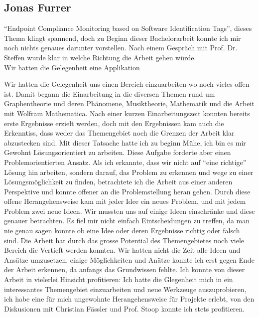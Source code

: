 \subsection{Jonas Furrer} 



\enquote{Endpoint Compliance Monitoring based on Software Identification Tags}, dieses Thema klingt spannend, doch zu Beginn dieser Bachelorarbeit konnte ich mir noch nichts genaues darunter vorstellen. Nach einem Gespräch mit Prof. Dr. Steffen wurde klar in welche Richtung die Arbeit gehen würde.\\
Wir hatten die Gelegenheit eine Applikation 

Wir hatten die Gelegenheit uns einen
Bereich einzuarbeiten wo noch vieles offen ist. Damit begann die Einarbeitung in
die diversen Themen rund um Graphentheorie und deren Phänomene, Musiktheorie,
Mathematik und die Arbeit mit Wolfram Mathematica. Nach einer kurzen
Einarbeitungszeit konnten bereits erste Ergebnisse erzielt werden, doch mit den
Ergebnissen kam auch die Erkenntiss, dass weder das Themengebiet noch die
Grenzen der Arbeit klar abzustecken sind. Mit dieser Tatsache hatte ich zu
beginn Mühe, ich bin es mir Gewohnt Lösungsorientiert zu arbeiten. Diese Aufgabe
forderte aber einen Problemorientierten Ansatz. Als ich erkannte, dass wir nicht
auf \enquote{eine richtige} Lösung hin arbeiten, sondern darauf, das Problem zu
erkennen und wege zu einer Lösungsmöglichkeit zu finden, betrachtete ich die
Arbeit aus einer anderen Perspektive und konnte offener an die Problemstellung
heran gehen. Durch diese offene Herangehensweise kam mit jeder Idee ein neues
Problem, und mit jedem Problem zwei neue Ideen. Wir mussten uns auf einige Ideen
einschränke und diese genauer betrachten. Es fiel mir nicht einfach
Eintscheidungen zu treffen, da man nie genau sagen konnte ob eine Idee oder
deren Ergebnisse richtig oder falsch sind. Die Arbeit hat durch das grosse
Potential des Themengebietes noch viele Bereich die Vertieft werden konnten. Wir
hatten nicht die Zeit alle Ideen und Ansätze umzusetzen, einige Möglichkeiten
und Anätze konnte ich erst gegen Ende der Arbeit erkennen, da anfangs das
Grundwissen fehlte. Ich konnte von dieser Arbeit in vielerlei Hinsicht
profitieren: Ich hatte die Glegenheit mich in ein interessantes Themengebiet
einzuarbeiten und neue Werkzeuge auszuprobieren, ich habe eine für mich
ungewohnte Herangehensweise für Projekte erlebt, von den Diskusionen mit
Christian Fässler und Prof. Stoop konnte ich stets profitieren.
